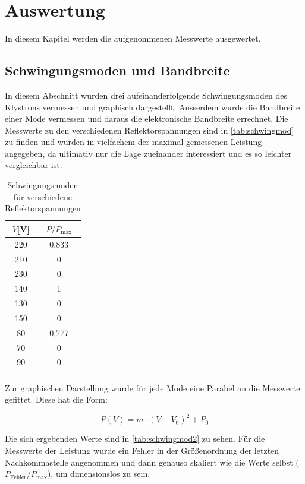 


\section{Auswertung}
\label{sec:auswertung}

In diesem Kapitel werden die aufgenommenen Messwerte ausgewertet.




\subsection{Schwingungsmoden und Bandbreite}
\label{sec:schwingungsmoden}

In diesem Abschnitt wurden drei aufeinanderfolgende Schwingungsmoden des Klystrons vermessen und graphisch dargestellt.
Ausserdem wurde die Bandbreite einer Mode vermessen und daraus die elektronische Bandbreite errechnet.
Die Messwerte zu den verschiedenen Reflektorspannungen sind in \autoref{tab:schwingmod} zu finden und wurden in vielfachem der maximal gemessenen Leistung angegeben, da ultimativ nur die Lage zueinander interessiert und es so leichter vergleichbar ist.


\begin{table}
\centering
\caption{Schwingungsmoden für verschiedene Reflektorspannungen}
\begin{tabular}{c c}
\toprule
{$V$[V]} & {$P/P_{\text{max}}$}\\
\midrule
220&	0,833\\
210	&0\\
230	&0\\
\midrule
140	&1\\
130	&0\\
150	&0\\
\midrule
80	&0,777\\
70	&0\\
90	&0\\
\bottomrule
\label{tab:schwingmod}
\end{tabular}
\end{table}



Zur graphischen Darstellung wurde für jede Mode eine Parabel an die Messwerte gefittet. Diese hat die Form:


\begin{equation}
P(V) = m\cdot (V - V_0)^2 + P_0
\label{eq:parabel}
\end{equation}

Die sich ergebenden Werte sind in \autoref{tab:schwingmod2} zu sehen. Für die Messwerte der Leistung wurde ein Fehler in der Größenordnung der letzten Nachkommastelle angenommen und dann genauso skaliert wie die Werte selbst ($P_{\text{Fehler}}/P_{\text{max}}$), um dimensionslos zu sein.

